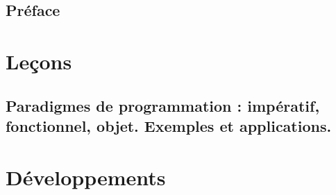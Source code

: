 







\tableofcontents

\chapter*{Préface}
%

\part{Leçons}

\chapter{Paradigmes de programmation : impératif, fonctionnel, objet. Exemples et applications.} \label{L2}



\makeatletter
\renewcommand{\@chapapp}{Développement}
\setcounter{chapter}{0}
\makeatother
\renewcommand\theHchapter{sec.\thechapter} %

\part{Développements}
 


